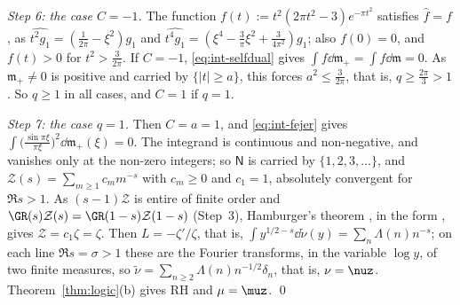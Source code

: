 \emph{Step 6: the case $C=-1$.} The function $f(t):=t^2(2\pi t^2-3)e^{-\pi t^2}$ satisfies $\widehat f=f$, as
$\widehat{t^2g_1}=(\frac1{2\pi}-\xi^2)g_1$ and $\widehat{t^4g_1}=(\xi^4-\frac3\pi\xi^2+\frac3{4\pi^2})g_1$; also $f(0)=0$, and $f(t)>0$ for
$t^2>\frac3{2\pi}$. If $C=-1$, \eqref{eq:int-selfdual} gives $\int f\dd\mathfrak m_+=\int f\dd\mathfrak m=0$. As $\mathfrak m_+\ne0$ is positive and carried by
$\{|t|\ge a\}$, this forces $a^2\le\frac3{2\pi}$, that is, $q\ge\frac{2\pi}3>1$. So $q\ge1$ in all cases, and $C=1$ if $q=1$.

\emph{Step 7: the case $q=1$.} Then $C=a=1$, and \eqref{eq:int-fejer} gives $\int\big(\frac{\sin\pi\xi}{\pi\xi}\big)^2\dd\mathfrak m_+(\xi)=0$. The
integrand is continuous and non-negative, and vanishes only at the non-zero integers; so $\mathsf N$ is carried by $\{1,2,3,\dots\}$, and
$\mathcal Z(s)=\sum_{m\ge1}c_mm^{-s}$ with $c_m\ge0$ and $c_1=1$, absolutely convergent for $\Re s>1$. As $(s-1)\mathcal Z$ is entire of finite order and
$\GR(s)\mathcal Z(s)=\GR(1-s)\mathcal Z(1-s)$ (Step~3), Hamburger's theorem \cite{Ham21}, in the form \cite[\S2.13]{Tit86}, gives $\mathcal Z=c_1\zeta=\zeta$. Then $L=-\zeta'/\zeta$, that is, $\int y^{1/2-s}\dd\tilde\nu(y)=\sum_n\Lambda(n)n^{-s}$; on each line $\Re s=\sigma>1$ these
are the Fourier transforms, in the variable $\log y$, of two finite measures, so $\tilde\nu=\sum_{n\ge2}\Lambda(n)n^{-1/2}\delta_n$, that is,
$\nu=\nuz$. Theorem~\ref{thm:logic}(b) gives RH and $\mu=\muz$. \qed
